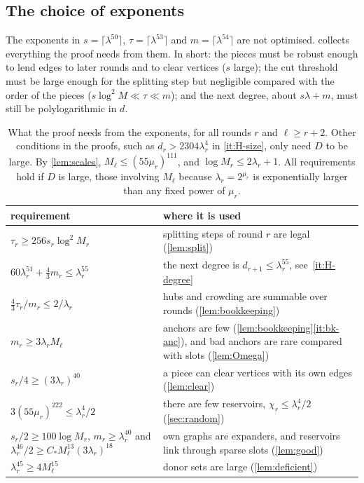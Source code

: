 \documentclass[11pt]{article}
\theoremstyle{definition}
\theoremstyle{remark}
\numberwithin{equation}{section}
\numberwithin{figure}{section}
\numberwithin{table}{section}
\begin{document}
\subsection{The choice of exponents}\label{sec:exponents}

The exponents in $s=\lceil\lambda^{50}\rceil$, $\tau=\lceil\lambda^{53}\rceil$
and $m=\lceil\lambda^{54}\rceil$ are not optimised. 
collects everything the proof needs from them. In short: the pieces must be
robust enough to lend edges to later rounds and to clear vertices ($s$ large);
the cut threshold must be large enough for the splitting step but negligible
compared with the order of the pieces ($s\log^2M\ll\tau\ll m$); and the next
degree, about $s\lambda+m$, must still be polylogarithmic in $d$.

\begin{table}[h]
\centering\small
\renewcommand{\arraystretch}{1.2}
\begin{tabular}{@{}p{}p{}@{}}
\toprule
requirement & where it is used\\
\midrule
$\tau_r\ge256s_r\log^2M_r$ & splitting steps of round $r$ are legal (\cref{lem:split})\\
$60\lambda_r^{51}+\frac43m_r\le\lambda_r^{55}$ & the next degree is $d_{r+1}\le\lambda_r^{55}$, see~\ref{it:H-degree}\\
$\frac43\tau_r/m_r\le2/\lambda_r$ & hubs and crowding are summable over rounds (\cref{lem:bookkeeping})\\
$m_r\ge3\lambda_rM_\ell$ & anchors are few (\cref{lem:bookkeeping}\ref{it:bk-anc}), and bad anchors are rare compared with slots (\cref{lem:Omega})\\
$s_r/4\ge(3\lambda_r)^{40}$ & a piece can clear vertices with its own edges (\cref{lem:clear})\\
$3(55\mu_r)^{222}\le\lambda_r^4/2$ & there are few reservoirs, $\chi_r\le\lambda_r^4/2$ (\cref{sec:random})\\
$s_r/2\ge100\log M_r$, $m_r\ge\lambda_r^{40}$ and $\lambda_r^{46}/2\ge C_*M_\ell^{13}(3\lambda_r)^{18}$ & own graphs are expanders, and reservoirs link through sparse slots (\cref{lem:good})\\
$\lambda_r^{45}\ge4M_\ell^{15}$ & donor sets are large (\cref{lem:deficient})\\
\bottomrule
\end{tabular}
\caption{What the proof needs from the exponents, for all rounds $r$ and
$\ell\ge r+2$. Other conditions in the proofs, such as $d_r>2304\lambda_r^4$ in
\ref{it:H-size}, only need $D$ to be large. By \cref{lem:scales}, $M_\ell\le(55\mu_r)^{111}$, and
$\log M_r\le2\lambda_r+1$. All requirements hold if $D$ is large, those
involving $M_\ell$ because $\lambda_r=2^{\mu_r}$ is exponentially larger than
any fixed power of $\mu_r$.}
\label{tab:requirements}
\end{table}
\end{document}
